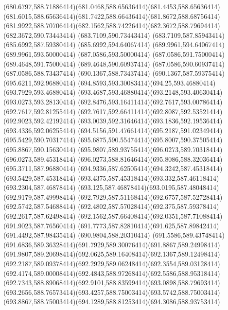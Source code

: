 {{	\curveto(680.6797,588.71886414)(681.0468,588.65636414)(681.4453,588.65636414)
	\curveto(681.6015,588.65636414)(681.7422,588.66436414)(681.8672,588.68756414)
	\curveto(681.9922,588.70706414)(682.1562,588.74226414)(682.3672,588.79694414)
	\lineto(682.3672,590.73443414)
	\lineto(683.7109,590.73443414)
	\lineto(683.7109,587.85943414)
	\closepath
	\moveto(685.6992,587.59380414)
	\lineto(685.6992,594.64067414)
	\lineto(689.9961,594.64067414)
	\lineto(689.9961,593.50000414)
	\lineto(687.0586,593.50000414)
	\lineto(687.0586,591.75000414)
	\lineto(689.4648,591.75000414)
	\lineto(689.4648,590.60937414)
	\lineto(687.0586,590.60937414)
	\lineto(687.0586,588.73437414)
	\lineto(690.1367,588.73437414)
	\lineto(690.1367,587.59375414)
	\closepath
	\moveto(695.6211,592.96880414)
	\curveto(694.8593,593.30083414)(694.25,593.46880414)(693.7929,593.46880414)
	\curveto(693.4687,593.46880414)(693.2148,593.40630414)(693.0273,593.28130414)
	\curveto(692.8476,593.16411414)(692.7617,593.00786414)(692.7617,592.81255414)
	\curveto(692.7617,592.66411414)(692.8087,592.53521414)(692.9023,592.42192414)
	\curveto(693.0039,592.31646414)(693.1836,592.19536414)(693.4336,592.06255414)
	\curveto(694.5156,591.47661414)(695.2187,591.02349414)(695.5429,590.70317414)
	\curveto(695.6875,590.55474414)(695.8007,590.37505414)(695.8867,590.15630414)
	\curveto(695.9807,589.93755414)(696.0273,589.70318414)(696.0273,589.45318414)
	\curveto(696.0273,588.81646414)(695.8086,588.32036414)(695.3711,587.96880414)
	\curveto(694.9336,587.62505414)(694.3242,587.45318414)(693.5429,587.45318414)
	\curveto(693.4375,587.45318414)(693.332,587.46118414)(693.2304,587.46878414)
	\curveto(693.125,587.46878414)(693.0195,587.48048414)(692.9179,587.49998414)
	\curveto(692.7929,587.51168414)(692.6757,587.52728414)(692.5742,587.54688414)
	\curveto(692.4802,587.57028414)(692.375,587.59378414)(692.2617,587.62498414)
	\curveto(692.1562,587.66408414)(692.0351,587.71088414)(691.9023,587.76560414)
	\curveto(691.7773,587.82810414)(691.625,587.89842414)(691.4492,587.98435414)
	\lineto(690.9804,588.20310414)
	\lineto(691.5586,589.43748414)
	\curveto(691.6836,589.36328414)(691.7929,589.30076414)(691.8867,589.24998414)
	\curveto(691.9807,589.20698414)(692.0625,589.16408414)(692.1367,589.12498414)
	\curveto(692.2187,589.09378414)(692.2929,589.06248414)(692.3554,589.03128414)
	\curveto(692.4174,589.00008414)(692.4843,588.97268414)(692.5586,588.95318414)
	\curveto(692.7343,588.89068414)(692.9101,588.83599414)(693.0898,588.79693414)
	\curveto(693.2656,588.76573414)(693.4257,588.75003414)(693.5742,588.75003414)
	\curveto(693.8867,588.75003414)(694.1289,588.81253414)(694.3086,588.93753414)
}}
